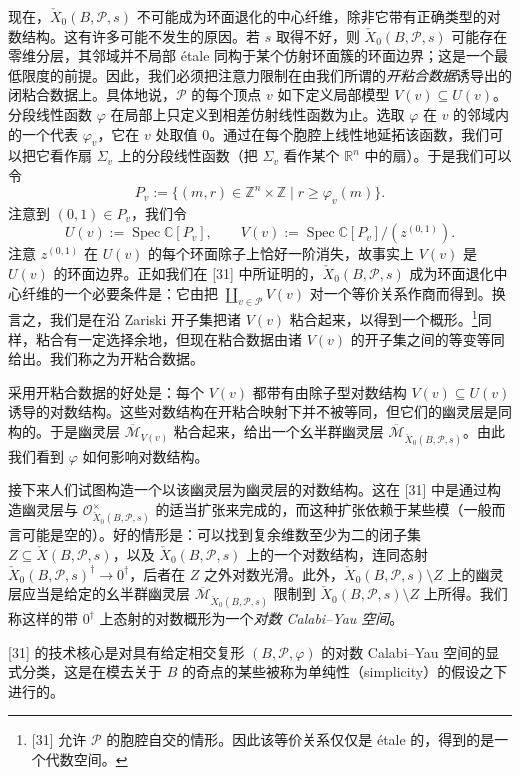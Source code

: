 现在，$\check X_0(B,\mathcal{P},s)$ 不可能成为环面退化的中心纤维，除非它带有正确类型的对数结构。这有许多可能不发生的原因。若 $s$
取得不好，则 $\check X_0(B,\mathcal{P},s)$ 可能存在零维分层，其邻域并不局部 étale 同构于某个仿射环面簇的环面边界；这是一个最低限度的前提。因此，我们必须把注意力限制在由我们所谓的\emph{开粘合数据}诱导出的闭粘合数据上。具体地说，$\mathcal{P}$ 的每个顶点 $v$ 如下定义局部模型 $V(v)\subseteq U(v)$。分段线性函数 $\varphi$ 在局部上只定义到相差仿射线性函数为止。选取 $\varphi$ 在 $v$ 的邻域内的一个代表 $\varphi_v$，它在 $v$ 处取值 $0$。通过在每个胞腔上线性地延拓该函数，我们可以把它看作扇 $\Sigma_v$ 上的分段线性函数（把 $\Sigma_v$ 看作某个 $\mathbb{R}^n$ 中的扇）。于是我们可以令
\[
P_v:=\{(m,r)\in\mathbb{Z}^n\times\mathbb{Z}\mid r\ge\varphi_v(m)\}.
\]
注意到 $(0,1)\in P_v$，我们令
\[
U(v):=\operatorname{Spec}\mathbb{C}[P_v],\qquad
V(v):=\operatorname{Spec}\mathbb{C}[P_v]/(z^{(0,1)}).
\]
注意 $z^{(0,1)}$ 在 $U(v)$ 的每个环面除子上恰好一阶消失，故事实上 $V(v)$ 是 $U(v)$ 的环面边界。正如我们在 [31] 中所证明的，$\check X_0(B,\mathcal{P},s)$ 成为环面退化中心纤维的一个必要条件是：它由把 $\coprod_{v\in\mathcal{P}}V(v)$ 对一个等价关系作商而得到。换言之，我们是在沿 Zariski 开子集把诸 $V(v)$ 粘合起来，以得到一个概形。\footnote{[31] 允许 $\mathcal{P}$ 的胞腔自交的情形。因此该等价关系仅仅是 étale 的，得到的是一个代数空间。}同样，粘合有一定选择余地，但现在粘合数据由诸 $V(v)$ 的开子集之间的等变等同给出。我们称之为开粘合数据。

采用开粘合数据的好处是：每个 $V(v)$ 都带有由除子型对数结构 $V(v)\subseteq U(v)$ 诱导的对数结构。这些对数结构在开粘合映射下并不被等同，但它们的幽灵层是同构的。于是幽灵层 $\overline{\mathcal{M}}_{V(v)}$ 粘合起来，给出一个幺半群幽灵层 $\overline{\mathcal{M}}_{\check X_0(B,\mathcal{P},s)}$。由此我们看到 $\varphi$ 如何影响对数结构。

接下来人们试图构造一个以该幽灵层为幽灵层的对数结构。这在 [31] 中是通过构造幽灵层与 $\mathcal{O}_{\check X_0(B,\mathcal{P},s)}^\times$ 的适当扩张来完成的，而这种扩张依赖于某些模（一般而言可能是空的）。好的情形是：可以找到复余维数至少为二的闭子集 $Z\subseteq\check X(B,\mathcal{P},s)$，以及 $\check X_0(B,\mathcal{P},s)$ 上的一个对数结构，连同态射 $\check X_0(B,\mathcal{P},s)^\dagger\to 0^\dagger$，后者在 $Z$ 之外对数光滑。此外，$\check X_0(B,\mathcal{P},s)\setminus Z$ 上的幽灵层应当是给定的幺半群幽灵层 $\overline{\mathcal{M}}_{\check X_0(B,\mathcal{P},s)}$ 限制到 $\check X_0(B,\mathcal{P},s)\setminus Z$ 上所得。我们称这样的带 $0^\dagger$ 上态射的对数概形为一个\emph{对数 Calabi--Yau 空间}。

[31] 的技术核心是对具有给定相交复形 $(B,\mathcal{P},\varphi)$ 的对数 Calabi--Yau 空间的显式分类，这是在模去关于 $B$ 的奇点的某些被称为单纯性（simplicity）的假设之下进行的。
